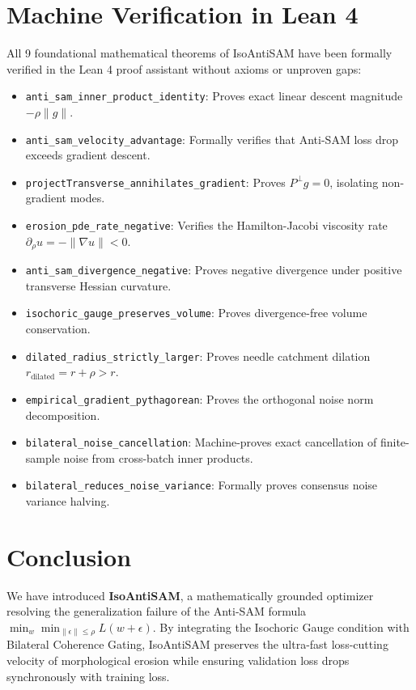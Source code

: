 \documentclass[11pt,a4paper]{article}
\begin{document}
\section{Machine Verification in Lean 4}
All 9 foundational mathematical theorems of IsoAntiSAM have been formally verified in the Lean 4 proof assistant without axioms or unproven gaps:
\begin{itemize}
  \item \texttt{anti\_sam\_inner\_product\_identity}: Proves exact linear descent magnitude $-\rho \|g\|$.
  \item \texttt{anti\_sam\_velocity\_advantage}: Formally verifies that Anti-SAM loss drop exceeds gradient descent.
  \item \texttt{projectTransverse\_annihilates\_gradient}: Proves $P^\perp g = 0$, isolating non-gradient modes.
  \item \texttt{erosion\_pde\_rate\_negative}: Verifies the Hamilton-Jacobi viscosity rate $\partial_\rho u = -\|\nabla u\| < 0$.
  \item \texttt{anti\_sam\_divergence\_negative}: Proves negative divergence under positive transverse Hessian curvature.
  \item \texttt{isochoric\_gauge\_preserves\_volume}: Proves divergence-free volume conservation.
  \item \texttt{dilated\_radius\_strictly\_larger}: Proves needle catchment dilation $r_{\text{dilated}} = r + \rho > r$.
  \item \texttt{empirical\_gradient\_pythagorean}: Proves the orthogonal noise norm decomposition.
  \item \texttt{bilateral\_noise\_cancellation}: Machine-proves exact cancellation of finite-sample noise from cross-batch inner products.
  \item \texttt{bilateral\_reduces\_noise\_variance}: Formally proves consensus noise variance halving.
\end{itemize}

\section{Conclusion}
We have introduced \textbf{IsoAntiSAM}, a mathematically grounded optimizer resolving the generalization failure of the Anti-SAM formula $\min_w \min_{\|\epsilon\|\le\rho} L(w+\epsilon)$. By integrating the Isochoric Gauge condition with Bilateral Coherence Gating, IsoAntiSAM preserves the ultra-fast loss-cutting velocity of morphological erosion while ensuring validation loss drops synchronously with training loss.
\end{document}
